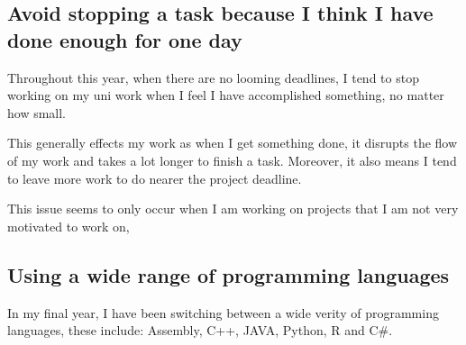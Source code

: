 \documentclass{scrartcl}
\begin{document}
\subsection{Avoid stopping a task because I think I have done enough for one day}

Throughout this year, when there are no looming deadlines, I tend to stop working on my uni work when I feel I have accomplished something, no matter how small.

This generally effects my work as when I get something done, it disrupts the flow of my work and takes a lot longer to finish a task. Moreover, it also means I tend to leave more work to do nearer the project deadline.

This issue seems to only occur when I am working on projects that I am not very motivated to work on, 
\par



\subsection{Using a wide range of programming languages}
In my final year, I have been switching between a wide verity of programming languages, these include:
Assembly, C++, JAVA, Python, R and C\#.



\par




%
\subsection{ }





\par






%



\end{document}
